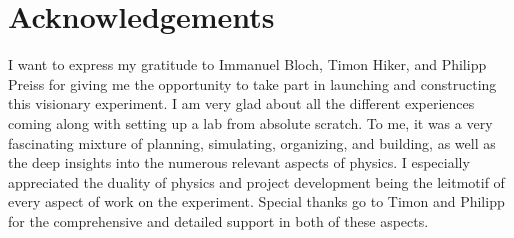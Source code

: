 \chapter*{Acknowledgements}

I want to express my gratitude to Immanuel Bloch, Timon Hiker, and Philipp Preiss for giving me the opportunity to take part in launching and constructing this visionary experiment. I am very glad about all the different experiences coming along with setting up a lab from absolute scratch. To me, it was a very fascinating mixture of planning, simulating, organizing, and building, as well as the deep insights into the numerous relevant aspects of physics. I especially appreciated the duality of physics and project development being the leitmotif of every aspect of work on the experiment. Special thanks go to Timon and Philipp for the comprehensive and detailed support in both of these aspects.

